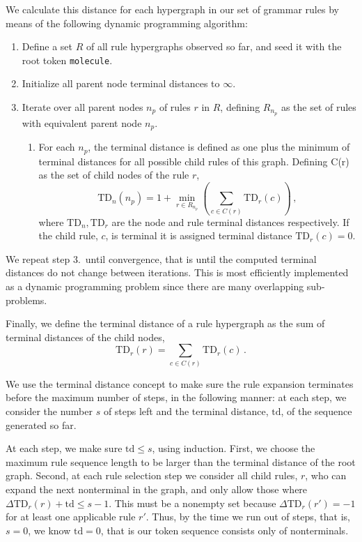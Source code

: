 \documentclass{article}
\newcommand{\TD}{\ensuremath{\text{TD}}}
\begin{document}
We calculate this distance for each hypergraph in our set of grammar rules by means of the following dynamic programming algorithm:
\begin{enumerate}
	\item Define a set $R$ of all rule hypergraphs observed so far, and seed it with the root token \verb+molecule+. 
    \item Initialize all parent node terminal distances to $\infty$.
    \item Iterate over all parent nodes $n_p$ of rules $r$ in $R$, defining $R_{n_p}$ as the set of rules with equivalent parent node $n_p$.
	\begin{enumerate}
        \item For each $n_p$, the terminal distance is defined as one plus the minimum of terminal distances for all possible child rules of this graph. Defining C(r) as the set of child nodes of the rule $r$,
            \begin{equation}\label{eq:td}
                \TD_n(n_p) = 1 + \min_{r \in R_{n_p}}\left(\sum_{c \in C(r)} \TD_r(c) \right)\,,
            \end{equation}
            where $\TD_n, \TD_r$ are the node and rule terminal distances respectively. If the child rule, $c$, is terminal it is assigned terminal distance $\TD_r(c) = 0$.
	\end{enumerate}
\end{enumerate}
We repeat step 3.~until convergence, that is until the computed terminal distances do not change between iterations. This is most efficiently implemented as a dynamic programming problem since there are many overlapping sub-problems.

Finally, we define the terminal distance of a rule hypergraph as the sum of terminal distances of the child nodes,
\begin{equation}
    \TD_r(r) = \sum_{c \in C(r)} \TD_r(c)\,.
\end{equation}

We use the terminal distance concept to make sure the rule expansion terminates before the maximum number of steps, in the following manner: at each step, we consider the number $s$ of steps left and the terminal distance, $\text{td}$, of the sequence generated so far. 

At each step, we make sure $\text{td}\le s$, using induction. First, we choose the maximum rule sequence length to be larger than the terminal distance of the root graph. Second, at each rule selection step we consider all child rules, $r$, who can expand the next nonterminal in the graph, and only allow those where $\Delta \TD_r(r) + \text{td} \le s-1$. This must be a nonempty set because $\Delta \TD_r(r') = -1$ for at least one applicable rule $r'$. Thus, by the time we run out of steps, that is, $s=0$, we know $\text{td}=0$, that is our token sequence consists only of nonterminals. 
\end{document}

